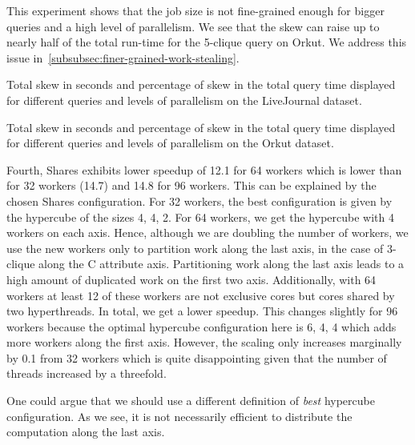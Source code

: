 This experiment shows that the job size is not fine-grained enough for bigger queries and a high level of parallelism.
We see that the skew can raise up to nearly half of the total run-time for the 5-clique query
on Orkut.
We address this issue in~\cref{subsubsec:finer-grained-work-stealing}.

\begin{table}
    \centering
    
    \caption{
    Total skew in seconds and percentage of skew in the total query time displayed for different
    queries and levels of parallelism on the LiveJournal dataset.
    }\label{table:skew-liveJ}
\end{table}

\begin{table}
    \centering
    
    \caption{
    Total skew in seconds and percentage of skew in the total query time displayed for different
    queries and levels of parallelism on the Orkut dataset.
    }\label{table:skew-orkut}
\end{table}

Fourth, Shares exhibits lower speedup of 12.1 for 64 workers which is
lower than for 32 workers (14.7) and 14.8 for 96 workers.
This can be explained by the chosen Shares configuration.
For 32 workers, the best configuration is given by the hypercube of the sizes 4, 4, 2.
For 64 workers, we get the hypercube with 4 workers on each axis.
Hence, although we are doubling the number of workers, we use the new workers only to partition
work along the last axis, in the case of 3-clique along the C attribute axis.
Partitioning work along the last axis leads to a high amount of duplicated work on the first
two axis.
Additionally, with 64 workers at least 12 of these workers are not exclusive cores but cores shared by
two hyperthreads.
In total, we get a lower speedup.
This changes slightly for 96 workers because the optimal hypercube configuration here is 6, 4, 4 which
adds more workers along the first axis.
However, the scaling only increases marginally by 0.1 from 32 workers which is quite disappointing given
that the number of threads increased by a threefold.

One could argue that we should use a different definition of \textit{best} hypercube configuration.
As we see, it is not necessarily efficient to distribute the computation along the last axis.

